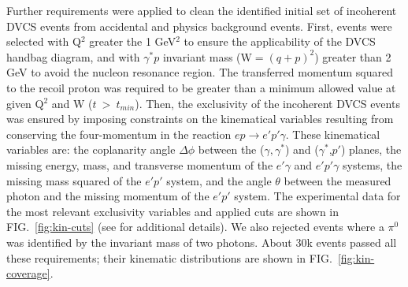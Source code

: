 \documentclass[twocolumn,nofootinbib,showpacs,prl,superscriptaddress,secnumarabic,amssymb,nobibnotes,aps,floatfix]{revtex4}
\begin{document}
Further requirements were applied to clean the identified initial set of 
incoherent DVCS events from accidental and physics background events. First, events were 
selected with Q$^{2}$ greater the 1 GeV$^2$ to ensure the applicability of the 
DVCS handbag diagram, and with $\gamma^{*}p$ invariant mass (W$=(q+p)^2$) greater than 2 GeV to 
avoid the nucleon resonance region. The transferred momentum squared to the recoil proton was required to be greater than a
minimum allowed value at given Q$^2$ and W ($t~>~t_{min}$). Then, the exclusivity of the incoherent DVCS events was 
ensured by imposing constraints on the kinematical variables resulting from 
conserving the four-momentum in the reaction $ep\rightarrow e'p'\gamma$. These 
kinematical variables are: the coplanarity angle $\Delta\phi$ between the 
($\gamma,\gamma^*$) and ($\gamma^*$,$p'$) planes, the missing energy, mass, and 
transverse momentum of the $e'\gamma$ and $e'p'\gamma$ systems, the missing mass 
squared of the $e'p'$ system, and the angle $\theta$ between the measured 
photon and the missing momentum of the $e'p'$ system. The experimental data for 
the most relevant exclusivity variables and applied cuts are shown in 
FIG.~\ref{fig:kin-cuts} (see \cite{Hattawy:thesis} for additional details). We 
also rejected events where a $\pi^0$ was identified by the invariant mass of 
two photons. About 30k events passed all these requirements; their kinematic 
distributions are shown in FIG.~\ref{fig:kin-coverage}.  
\end{document}
